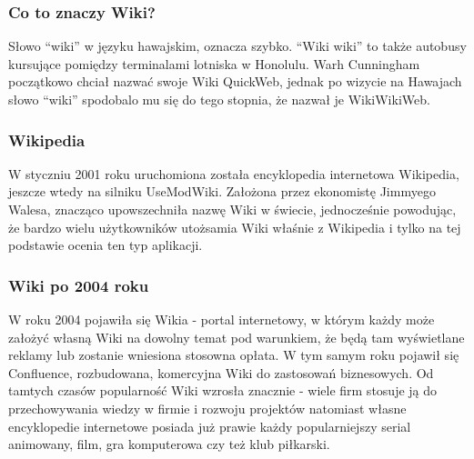 \documentclass{article}
\begin{document}
	\subsubsection{Co to znaczy Wiki?}
		Słowo ``wiki'' w języku hawajskim, oznacza szybko. ``Wiki wiki'' to także autobusy kursujące pomiędzy terminalami lotniska w Honolulu. Warh Cunningham początkowo chciał nazwać swoje Wiki QuickWeb, jednak po wizycie na Hawajach słowo ``wiki'' spodobalo mu się do tego stopnia, że nazwał je WikiWikiWeb.
	\subsubsection{Wikipedia}
	W styczniu 2001 roku uruchomiona została encyklopedia internetowa Wikipedia, jeszcze wtedy na silniku UseModWiki. Założona przez ekonomistę Jimmyego Walesa, znacząco upowszechniła nazwę Wiki w świecie, jednocześnie powodując, że bardzo wielu użytkowników utożsamia Wiki właśnie z Wikipedia i tylko na tej podstawie ocenia ten typ aplikacji.
	
	\subsubsection{Wiki po 2004 roku}
	W roku 2004 pojawiła się Wikia - portal internetowy, w którym każdy może założyć własną Wiki na dowolny temat pod warunkiem, że będą tam wyświetlane reklamy lub zostanie wniesiona stosowna opłata. W tym samym roku pojawił się Confluence, rozbudowana, komercyjna Wiki do zastosowań biznesowych. Od tamtych czasów popularność Wiki wzrosła znacznie - wiele firm stosuje ją do przechowywania wiedzy w firmie i rozwoju projektów natomiast własne encyklopedie internetowe posiada już prawie każdy popularniejszy serial animowany, film, gra komputerowa czy też klub piłkarski. 

% 

\end{document}
